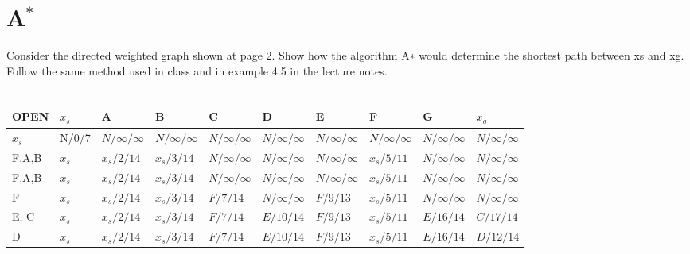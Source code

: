 \documentclass[12pt,letterpaper]{article}
\begin{document}
\section{A$^{\ast}$}
Consider the directed weighted graph shown at page 2.
Show how the algorithm A∗ would determine the shortest path between xs and xg. Follow the
same method used in class and in example 4.5 in the lecture notes.
\\
\\
\begin{adjustwidth}{-1.2cm}{}
    \begin{tabularx}{1.15\textwidth} {
            | >{\centering\arraybackslash}X
            | >{\centering\arraybackslash}X
            | >{\centering\arraybackslash}X
            | >{\centering\arraybackslash}X
            | >{\centering\arraybackslash}X
            | >{\centering\arraybackslash}X
            | >{\centering\arraybackslash}X
            | >{\centering\arraybackslash}X
            | >{\centering\arraybackslash}X
            | >{\centering\arraybackslash}X | }
        \hline
            OPEN & $x_{s}$ & A & B & C & D & E & F & G & $x_{g}$
            \\
        \hline
            $x_{s}$ & N/0/7 & $N/\infty/\infty$ & $N/\infty/\infty$ & $N/\infty/\infty$ & $N/\infty/\infty$ & $N/\infty/\infty$ & $N/\infty/\infty$ & $N/\infty/\infty$ & $N/\infty/\infty$
            \\
        \hline
            F,A,B & $x_{s}$ & $x_{s}/2/14$ & $x_{s}/3/14$ & $N/\infty/\infty$ & $N/\infty/\infty$ & $N/\infty/\infty$ & $x_{s}/5/11$ & $N/\infty/\infty$ & $N/\infty/\infty$
            \\
        \hline
            F,A,B & $x_{s}$ & $x_{s}/2/14$ & $x_{s}/3/14$ & $N/\infty/\infty$ & $N/\infty/\infty$ & $N/\infty/\infty$ & $x_{s}/5/11$ & $N/\infty/\infty$ & $N/\infty/\infty$
            \\
        \hline
            F & $x_{s}$ & $x_{s}/2/14$ & $x_{s}/3/14$ & $F/7/14$ & $N/\infty/\infty$ & $F/9/13$ & $x_{s}/5/11$ & $N/\infty/\infty$ & $N/\infty/\infty$
            \\
        \hline
            E, C & $x_{s}$ & $x_{s}/2/14$ & $x_{s}/3/14$ & $F/7/14$ & $E/10/14$ & $F/9/13$ & $x_{s}/5/11$ & $E/16/14$ & $C/17/14$
            \\
        \hline
            D & $x_{s}$ & $x_{s}/2/14$ & $x_{s}/3/14$ & $F/7/14$ & $E/10/14$ & $F/9/13$ & $x_{s}/5/11$ & $E/16/14$ & $D/12/14$
            \\
        \hline
    \end{tabularx}
\end{adjustwidth}
\end{document}
